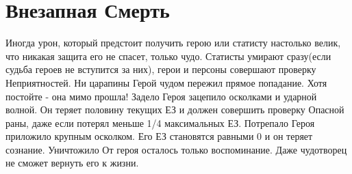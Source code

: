 \section{Внезапная Смерть}
Иногда урон, который предстоит получить герою или статисту настолько велик, что никакая защита его не спасет, только чудо. Статисты умирают сразу(если судьба героев не вступится за них), герои и персоны совершают проверку Неприятностей.
\trouble
{Ни царапины}%
{Герой чудом пережил прямое попадание. Хотя постойте - она мимо прошла!}%
{Задело}%
{Героя зацепило осколками и ударной волной. Он теряет половину текущих ЕЗ и должен совершить проверку Опасной раны, даже если потерял меньше 1/4 максимальных ЕЗ.}%
{Потрепало}%
{Героя приложило крупным осколком. Его ЕЗ становятся равными 0 и он теряет сознание.}%
{Уничтожило}%
{От героя осталось только воспоминание. Даже чудотворец не сможет вернуть его к жизни.}%